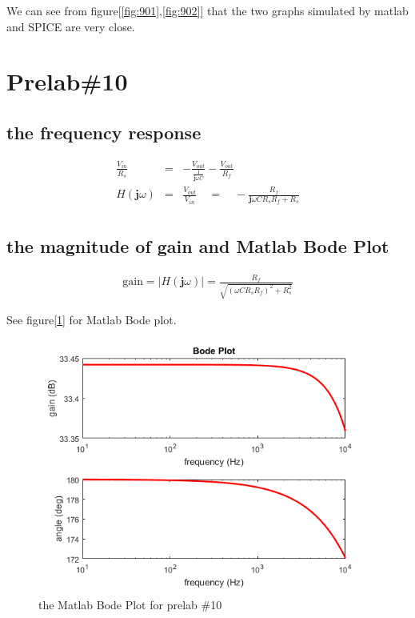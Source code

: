 \documentclass{IEEEtran}
\begin{document}
	\phantom{ } We can see from figure[\ref{fig:901},\ref{fig:902}] that the two graphs simulated by matlab and SPICE are very close. 
	\section{\textbf{Prelab\#10}}
	\subsection{the frequency response}
	\begin{eqnarray*}
		\frac{V_{in}}{R_s} & = & -\frac{V_{out}}{\frac{1}{\mathbf{j}\omega C}} - \frac{V_{out}}{R_f}\\
		H(\mathbf{j}\omega) & = & \frac{V_{out}}{V_{in}} \quad = \quad -\frac{R_f}{\mathbf{j}\omega CR_sR_f + R_s}\\
	\end{eqnarray*}
	\subsection{the magnitude of gain and Matlab Bode Plot}
	\begin{eqnarray*}
		\mathrm{gain} = |H(\mathbf{j}\omega)| = \frac{R_f}{\sqrt{(\omega C R_s R_f)^2 + R_s^2}}
	\end{eqnarray*}

	See figure[\ref{fig:1001}] for Matlab Bode plot.
	\begin{figure}[!htbp]
		\centering
		\begin{framed}
			\includegraphics[width=\linewidth]{images/10.png}
			\caption{the Matlab Bode Plot for prelab \#10}
			\label{fig:1001}
		\end{framed}
	\end{figure}
\end{document}
